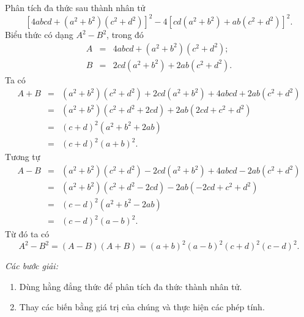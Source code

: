 \begin{vd}
	Phân tích đa thức sau thành nhân tử
	\[\left[4abcd + \left(a^2 + b^2\right)\left(c^2 + d^2\right)\right]^2 - 4 \left[cd \left(a^2 + b^2\right) + ab \left(c^2 + d^2\right)\right]^2.\]
	\loigiai 
	{
		Biểu thức có dạng $A^2 - B^2$, trong đó
		{\allowdisplaybreaks
		\begin{eqnarray*}
			A &=& 4abcd + \left(a^2 + b^2\right)\left(c^2 + d^2\right); \\
			B &=& 2cd \left(a^2 + b^2\right) + 2ab \left(c^2 + d^2\right).
		\end{eqnarray*}
		}
		Ta có
		{\allowdisplaybreaks
		\begin{eqnarray*}
			A+B &=& \left(a^2 + b^2\right)\left(c^2 + d^2\right) + 2cd \left(a^2 + b^2\right) + 4abcd + 2ab \left(c^2 + d^2\right) \\
			&=& \left(a^2 + b^2\right)\left(c^2 + d^2 + 2cd\right) + 2ab \left(2cd + c^2 + d^2\right) \\
			&=& (c+d)^2 \left(a^2 + b^2 + 2ab\right) \\
			&=& (c+d)^2(a+b)^2.
		\end{eqnarray*}	
		}
		Tương tự		
		{\allowdisplaybreaks
		\begin{eqnarray*}
			A-B &=& \left(a^2 + b^2\right)\left(c^2 + d^2\right) - 2cd \left(a^2 + b^2\right) + 4abcd - 2ab \left(c^2 + d^2\right) \\
			&=& \left(a^2 + b^2\right)\left(c^2 + d^2 - 2cd\right) - 2ab \left(-2cd + c^2 + d^2\right) \\
			&=& (c-d)^2 \left(a^2 + b^2 - 2ab\right) \\
			&=& (c-d)^2(a-b)^2.
		\end{eqnarray*}
		}
		Từ đó ta có \[A^2 - B^2 = (A-B)(A+B) = (a+b)^2(a-b)^2(c+d)^2(c-d)^2.\]
	}
\end{vd}

\begin{dang}
	\emph{Các bước giải:} 
		\begin{enumerate}
			\item Dùng hằng đẳng thức để phân tích đa thức thành nhân tử.
			\item Thay các biến bằng giá trị của chúng và thực hiện các phép tính.
		\end{enumerate}
\end{dang}

